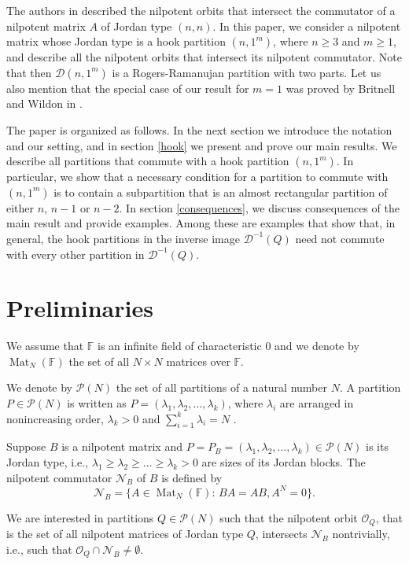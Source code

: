 \documentclass[11pt]{amsproc}
\newcommand{\Pset}{\mathcal{P}}
\newcommand{\D}{\mathcal{D}}
\newcommand{\Nil}{\mathcal{N}}
\newcommand{\cO}{\mathcal{O}}
\newcommand{\FF}{\mathbb{F}}
\begin{document}
The authors in \cite[Thm. 3]{BDKOS} described the nilpotent orbits that intersect the commutator of a nilpotent matrix $A$ of Jordan type $(n,n)$. In this paper, we consider a nilpotent matrix whose Jordan type is a hook partition $(n,1^m)$, where $n\ge 3$ and $m\ge 1$, and describe all the nilpotent orbits that intersect its nilpotent commutator. Note that then $\D(n,1^m)$ is a Rogers-Ramanujan partition with two parts. Let us also mention that the special case of our result for $m=1$ was proved by Britnell and Wildon in \cite[Prop. 4.9]{BW}. 

The paper is organized as follows. In the next section we introduce the notation and our setting, and in section \ref{hook} we present and prove our main results. We describe all partitions that commute with a hook partition $(n,1^m)$. In particular, we show that a necessary condition for a partition to commute with $(n,1^m)$ is to contain a subpartition that is an almost rectangular partition of either $n$, $n-1$ or $n-2$. In section \ref{consequences}, we discuss consequences of the main result and provide examples. Among these are examples that show that, in general, the hook partitions in the inverse image $\D^{-1}(Q)$ need not commute with every other partition in $\D^{-1}(Q)$. 


\section{Preliminaries}

We assume that $\FF$ is an infinite field of characteristic $0$ and we denote by $\operatorname{Mat}_N(\FF)$ the set of all $N\times N$ matrices over $\FF$. 

We denote by $\Pset(N)$ the set of all partitions of a natural number $N$. A partition $P\in\Pset(N)$ is written as $P=(\lambda_1,\lambda_2,\ldots,\lambda_k)$, where $\lambda_i$ are arranged in nonincreasing order,  $\lambda_k> 0$ and $\sum_{i=1}^k \lambda_i=N$ . 

Suppose $B$ is a nilpotent matrix and $P=P_B=(\lambda_1,\lambda_2,\ldots,\lambda_k)\in\Pset(N)$ is its Jordan type, i.e., $\lambda_1\ge \lambda_2\ge\ldots\ge \lambda_k>0$ are sizes of its Jordan blocks. The nilpotent commutator $\Nil_B$ of $B$ is defined by 
$$\Nil_B=\{A\in \operatorname{Mat} _N(\FF):\,BA=AB,A^N=0\}.$$ 

We are interested in partitions $Q\in\Pset(N)$ such that the nilpotent orbit $\cO_{Q}$, that is the set of all nilpotent matrices of Jordan type $Q$, intersects $\Nil_B$ nontrivially, i.e., such that $\cO_{Q}\cap\Nil_B\neq\emptyset$. 
\end{document}
